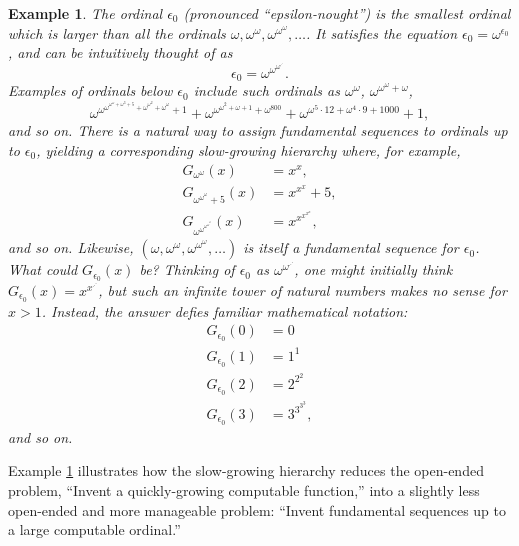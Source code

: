 \documentclass{article}
\newtheorem{example}[theorem]{Example}
\begin{document}
\begin{example}
\label{epsilon0example}
    The ordinal $\epsilon_0$
    (pronounced ``epsilon-nought'') is the smallest ordinal which is larger than
    all the ordinals $\omega, \omega^\omega, \omega^{\omega^\omega}, \ldots$.
    It satisfies the equation $\epsilon_0=\omega^{\epsilon_0}$, and can be
    intuitively thought of as
    \[
        \epsilon_0 = \omega^{\omega^{\omega^{\iddots}}}.
    \]
    Examples of ordinals below $\epsilon_0$ include such ordinals as
    $\omega^\omega$, $\omega^{\omega^\omega+\omega}$,
    \[
        \omega^{\omega^{\omega^{\omega^\omega+\omega^3+5}+\omega^{\omega^2}+\omega^\omega}+1}
        +\omega^{\omega^{\omega^2+\omega+1}+\omega^{800}}
        +\omega^{\omega^5\cdot 12 + \omega^4\cdot 9 + 1000}
        +1,
    \]
    and so on. There is a natural way to assign fundamental sequences to ordinals
    up to $\epsilon_0$, yielding a corresponding slow-growing hierarchy where, for example,
    \begin{align*}
        G_{\omega^\omega}(x) &= x^x,\\
        G_{\omega^{\omega^\omega}+5}(x) &= x^{x^x}+5,\\
        G_{\omega^{\omega^{\omega^{\omega^\omega}}}}(x) &= x^{x^{x^{x^{x}}}},
    \end{align*}
    and so on. Likewise, $(\omega,\omega^\omega,\omega^{\omega^\omega},\ldots)$ is itself a
    fundamental sequence for $\epsilon_0$. What could $G_{\epsilon_0}(x)$ be?
    Thinking of $\epsilon_0$ as $\omega^{\omega^{\iddots}}$, one might initially think
    $G_{\epsilon_0}(x)=x^{x^{\iddots}}$, but such an infinite tower of natural numbers
    makes no sense for $x>1$. Instead, the answer defies familiar mathematical notation:
    \begin{align*}
        G_{\epsilon_0}(0) &= 0\\
        G_{\epsilon_0}(1) &= 1^1\\
        G_{\epsilon_0}(2) &= 2^{2^2}\\
        G_{\epsilon_0}(3) &= 3^{3^{3^3}},
    \end{align*}
    and so on.
\end{example}

Example \ref{epsilon0example} illustrates how the slow-growing hierarchy reduces
the open-ended problem, ``Invent a quickly-growing computable function,'' into a slightly
less open-ended and more manageable problem: ``Invent fundamental sequences up to a
large computable ordinal.''
\end{document}
